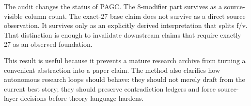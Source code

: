 The audit changes the status of PAGC. The 8-modifier part survives as a source-visible column count. The exact-27 base claim does not survive as a direct source observation. It survives only as an explicitly derived interpretation that splits f/v. That distinction is enough to invalidate downstream claims that require exactly 27 as an observed foundation.

This result is useful because it prevents a mature research archive from turning a convenient abstraction into a paper claim. The method also clarifies how autonomous research loops should behave: they should not merely draft from the current best story; they should preserve contradiction ledgers and force source-layer decisions before theory language hardens.
